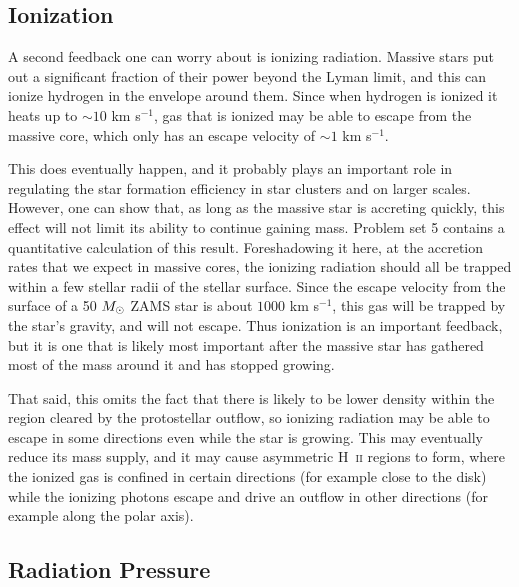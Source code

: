 \subsection{Ionization}

A second feedback one can worry about is ionizing radiation. Massive stars put out a significant fraction of their power beyond the Lyman limit, and this can ionize hydrogen in the envelope around them. Since when hydrogen is ionized it heats up to $\sim 10$ km s$^{-1}$, gas that is ionized may be able to escape from the massive core, which only has an escape velocity of $\sim 1$ km s$^{-1}$.

This does eventually happen, and it probably plays an important role in regulating the star formation efficiency in star clusters and on larger scales. However, one can show that, as long as the massive star is accreting quickly, this effect will not limit its ability to continue gaining mass. Problem set 5 contains a quantitative calculation of this result. Foreshadowing it here, at the accretion rates that we expect in massive cores, the ionizing radiation should all be trapped within a few stellar radii of the stellar surface. Since the escape velocity from the surface of a 50 $M_{\odot}$ ZAMS star is about $1000$ km s$^{-1}$, this gas will be trapped by the star's gravity, and will not escape. Thus ionization is an important feedback, but it is one that is likely most important after the massive star has gathered most of the mass around it and has stopped growing.

That said, this omits the fact that there is likely to be lower density within the region cleared by the protostellar outflow, so ionizing radiation may be able to escape in some directions even while the star is growing. This may eventually reduce its mass supply, and it may cause asymmetric H~\textsc{ii} regions to form, where the ionized gas is confined in certain directions (for example close to the disk) while the ionizing photons escape and drive an outflow in other directions (for example along the polar axis).

\subsection{Radiation Pressure}

